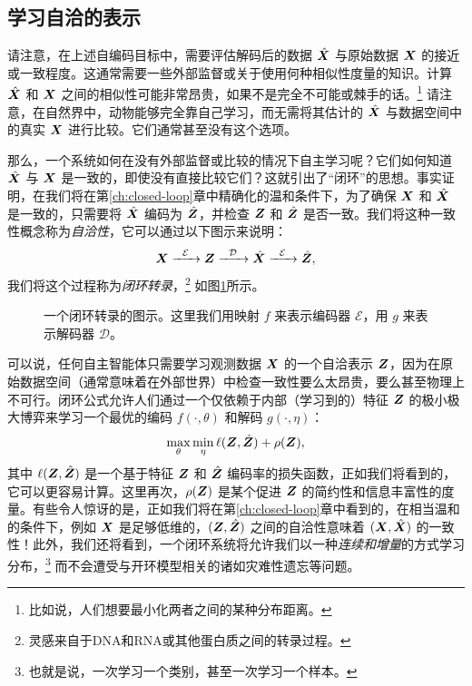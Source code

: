 \documentclass[../../book-main_zh.tex]{subfiles}
\begin{document}
\subsection{学习自洽的表示}
请注意，在上述自编码目标中，需要评估解码后的数据 $\hat {\bm{X}}$ 与原始数据 $\bm{X}$ 的接近或一致程度。这通常需要一些外部监督或关于使用何种相似性度量的知识。计算 $\hat {\bm{X}}$ 和 $\bm{X}$ 之间的相似性可能非常昂贵，如果不是完全不可能或棘手的话。\footnote{比如说，人们想要最小化两者之间的某种分布距离。} 请注意，在自然界中，动物能够完全靠自己学习，而无需将其估计的 $\hat {\bm{X}}$ 与数据空间中的真实 $\bm{X}$ 进行比较。它们通常甚至没有这个选项。

那么，一个系统如何在没有外部监督或比较的情况下自主学习呢？它们如何知道 $\hat {\bm{X}}$ 与 $\bm{X}$ 是一致的，即使没有直接比较它们？这就引出了“闭环”的思想。事实证明，在我们将在第\ref{ch:closed-loop}章中精确化的温和条件下，为了确保 $\bm{X}$ 和 $\hat {\bm{X}}$ 是一致的，只需要将 $\hat {\bm{X}}$ 编码为 $\hat {\bm{Z}}$，并检查 $\bm{Z}$ 和 $\hat {\bm{Z}}$ 是否一致。我们将这种一致性概念称为{\em 自洽性}，它可以通过以下图示来说明：
\begin{equation}
    \bm{X}   \xrightarrow{\hspace{2mm} \mathcal{E}\hspace{2mm}} \bm{Z}  \xrightarrow{\hspace{2mm} \mathcal{D} \hspace{2mm}} \hat {\bm{X}} \xrightarrow{\hspace{2mm} \mathcal{E}\hspace{2mm}} \hat {\bm{Z}},
    \label{eqn:closed-loop}
\end{equation}
我们将这个过程称为{\em 闭环转录}，\footnote{灵感来自于DNA和RNA或其他蛋白质之间的转录过程。} 如图\ref{fig:closed-loop}所示。

\begin{figure}[t]
\caption{一个闭环转录的图示。这里我们用映射 $f$ 来表示编码器 $\mathcal{E}$，用 $g$ 来表示解码器 $\mathcal{D}$。}  \label{fig:closed-loop}
\end{figure}

可以说，任何自主智能体只需要学习观测数据 $\bm{X}$ 的一个自洽表示 $\bm{Z}$，因为在原始数据空间（通常意味着在外部世界）中检查一致性要么太昂贵，要么甚至物理上不可行。闭环公式允许人们通过一个仅依赖于内部（学习到的）特征 $\bm{Z}$ 的极小极大博弈来学习一个最优的编码 $f(\cdot, \theta)$ 和解码 $g(\cdot, \eta)$：
\begin{equation}
\max_{\theta}\min_{\eta} \ell( \bm{Z}, \hat {\bm{Z}}) + \rho(\bm{Z}), 
   \label{eqn:closed-loop-objective}
\end{equation}
其中 $\ell( \bm{Z}, \hat {\bm{Z}})$ 是一个基于特征 $\bm{Z}$ 和 $\hat {\bm{Z}}$ 编码率的损失函数，正如我们将看到的，它可以更容易计算。这里再次，$\rho(\bm{Z})$ 是某个促进 $\bm{Z}$ 的简约性和信息丰富性的度量。有些令人惊讶的是，正如我们将在第\ref{ch:closed-loop}章中看到的，在相当温和的条件下，例如 $\bm{X}$ 是足够低维的，$(\bm{Z}, \hat {\bm{Z}})$ 之间的自洽性意味着 $(\bm{X}, \hat {\bm{X}})$ 的一致性！此外，我们还将看到，一个闭环系统将允许我们以一种{\em 连续和增量}的方式学习分布，\footnote{也就是说，一次学习一个类别，甚至一次学习一个样本。} 而不会遭受与开环模型相关的诸如灾难性遗忘等问题。
\end{document}
